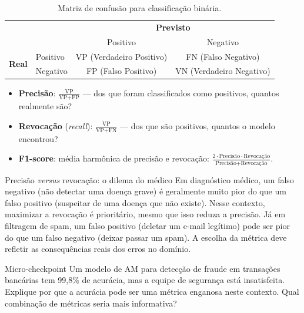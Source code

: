 \documentclass[12pt,a4paper]{article}
\begin{document}
\begin{table}[ht]
\centering
\caption{Matriz de confusão para classificação binária.}
\label{tab:matriz-confusao}
\renewcommand{\arraystretch}{1.3}
\begin{tabular}{llcc}
\toprule
 & & \multicolumn{2}{c}{\textbf{Previsto}} \\
 & & Positivo & Negativo \\
\midrule
\multirow{2}{*}{\textbf{Real}} & Positivo & VP (Verdadeiro Positivo) & FN (Falso Negativo) \\
                                & Negativo & FP (Falso Positivo) & VN (Verdadeiro Negativo) \\
\bottomrule
\end{tabular}
\end{table}

\begin{itemize}[nosep]
    \item \textbf{Precisão}: $\frac{\text{VP}}{\text{VP}+\text{FP}}$ — dos que foram classificados como positivos, quantos realmente são?
    \item \textbf{Revocação} (\textit{recall}): $\frac{\text{VP}}{\text{VP}+\text{FN}}$ — dos que são positivos, quantos o modelo encontrou?
    \item \textbf{F1-score}: média harmônica de precisão e revocação: $\frac{2 \cdot \text{Precisão} \cdot \text{Revocação}}{\text{Precisão}+\text{Revocação}}$.
\end{itemize}

\begin{notabox}{Precisão \textit{versus} revocação: o dilema do médico}
Em diagnóstico médico, um falso negativo (não detectar uma doença grave) é geralmente muito pior do que um falso positivo (suspeitar de uma doença que não existe). Nesse contexto, maximizar a revocação é prioritário, mesmo que isso reduza a precisão. Já em filtragem de spam, um falso positivo (deletar um e-mail legítimo) pode ser pior do que um falso negativo (deixar passar um spam). A escolha da métrica deve refletir as consequências reais dos erros no domínio.
\end{notabox}

\begin{checkpointbox}{Micro-checkpoint}
Um modelo de AM para detecção de fraude em transações bancárias tem 99{,}8\% de acurácia, mas a equipe de segurança está insatisfeita. Explique por que a acurácia pode ser uma métrica enganosa neste contexto. Qual combinação de métricas seria mais informativa?
\end{checkpointbox}
\end{document}
